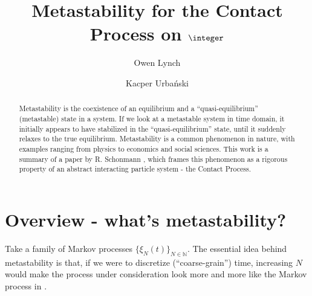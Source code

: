 \documentclass{scrartcl}
\title{Metastability for the Contact Process on $\integer$}
\author{Owen Lynch \and Kacper Urbański}
\begin{document}
\maketitle
\begin{abstract}
    Metastability is the coexistence of an equilibrium and a ``quasi-equilibrium'' (metastable) state in a system. If we look at a metastable system in time domain, it 
    initially appears to have stabilized in the ``quasi-equilibrium'' state,
    until it suddenly relaxes to the true equilibrium. Metastability is a common phenomenon in nature, with examples ranging from physics to economics and social sciences. 
    This work is a summary of a paper by R. Schonmann \cite{schonmann}, which
    frames this phenomenon as a rigorous property of an abstract interacting particle system - the Contact Process.
\end{abstract}

\section{Overview - what's metastability?} \label{overview}

Take a family of Markov processes $\{\xi_N(t)\}_{N\in\mathbb{N}}$. The essential idea behind metastability is that, if we were to discretize (``coarse-grain'') time, increasing $N$
would make
the process under consideration look more and more like the Markov process in .
\end{document}
